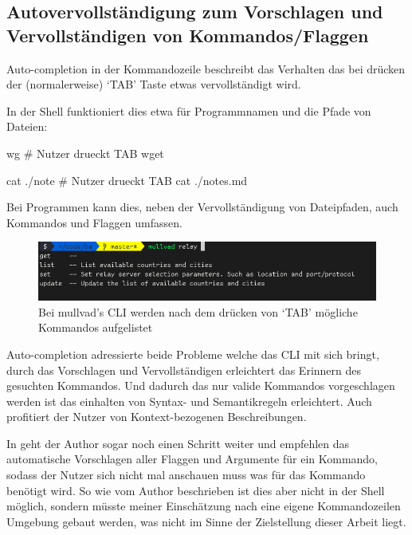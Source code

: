 \documentclass[oneside,bibliography=totocnumbered,BCOR=5mm]{scrbook}
\newenvironment{code}{\captionsetup{type=listing, skip=0pt}}{}
\begin{document}


\subsection{Autovervollständigung zum Vorschlagen und Vervollständigen von Kommandos/Flaggen}

Auto-completion in der Kommandozeile beschreibt das Verhalten das bei drücken der
(normalerweise) `TAB' Taste etwas vervollständigt wird.

In der Shell funktioniert dies etwa für Programmnamen und die Pfade von Dateien:
\begin{code}
  \begin{shellcode}
wg # Nutzer drueckt TAB
wget

cat ./note # Nutzer drueckt TAB
cat ./notes.md
  \end{shellcode}
  \medskip
\end{code}

Bei Programmen kann dies, neben der Vervollständigung von Dateipfaden, auch
Kommandos und Flaggen umfassen.

\begin{figure}
  \centering
  \includegraphics[scale=0.5]{mullvad-autocomplete.png}
  \caption{Bei mullvad's CLI werden nach dem drücken von `TAB' mögliche Kommandos aufgelistet}
  \label{fig:autocomplete}
\end{figure}



Auto-completion adressierte beide Probleme welche das CLI mit sich bringt, durch
das Vorschlagen und Vervollständigen erleichtert das Erinnern des gesuchten
Kommandos. Und dadurch das nur valide Kommandos vorgeschlagen werden ist das
einhalten von Syntax- und Semantikregeln erleichtert. Auch profitiert der Nutzer
von Kontext-bezogenen Beschreibungen.

In \cite{dutta} geht der Author sogar noch einen Schritt weiter und empfehlen
das automatische Vorschlagen aller Flaggen und Argumente für ein Kommando,
sodass der Nutzer sich nicht mal anschauen muss was für das Kommando benötigt
wird. So wie vom Author beschrieben ist dies aber nicht in der Shell möglich,
sondern müsste meiner Einschätzung nach eine eigene Kommandozeilen Umgebung
gebaut werden, was nicht im Sinne der Zielstellung dieser Arbeit liegt.
\end{document}
